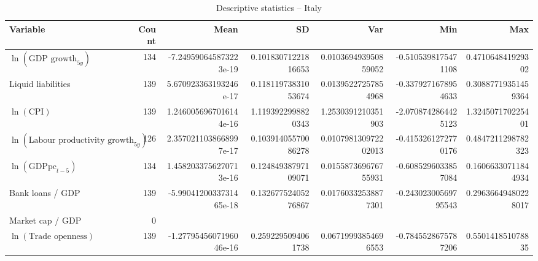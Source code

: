\begin{table}[!htbp]
\centering
\caption{Descriptive statistics -- Italy}
\footnotesize
\begin{tabular}{lrrrrrr}
\toprule
Variable & Count & Mean & SD & Var & Min & Max \\
\midrule
$\ln(\text{GDP growth}_{5y})$ & 134 & -7.249590645873223e-19 & 0.10183071221816653 & 0.010369493950859052 & -0.5105398175471108 & 0.471064841929302 \\
Liquid liabilities & 139 & 5.670923363193246e-17 & 0.11811973831053674 & 0.01395227257854968 & -0.3379271678954633 & 0.30887719351459364 \\
$\ln(\text{CPI})$ & 139 & 1.2460056967016144e-16 & 1.1193922998820343 & 1.2530391210351903 & -2.0708742864425123 & 1.324507170225401 \\
$\ln(\text{Labour productivity growth}_{5y})$ & 126 & 2.3570211038668997e-17 & 0.10391405570086278 & 0.010798130972202013 & -0.4153261272770176 & 0.4847211298782323 \\
$\ln(\text{GDPpc}_{t-5})$ & 134 & 1.4582033756270713e-16 & 0.12484938797109071 & 0.015587369676755931 & -0.6085296033857084 & 0.16066330711844934 \\
Bank loans / GDP & 139 & -5.9904120033731465e-18 & 0.13267752405276867 & 0.01760332538877301 & -0.24302300569795543 & 0.29636649480228017 \\
Market cap / GDP & 0 &  &  &  &  &  \\
$\ln(\text{Trade openness})$ & 139 & -1.2779545607196046e-16 & 0.2592295094061738 & 0.06719993854696553 & -0.7845528675787206 & 0.550141851078835 \\
\bottomrule
\end{tabular}
\end{table}


